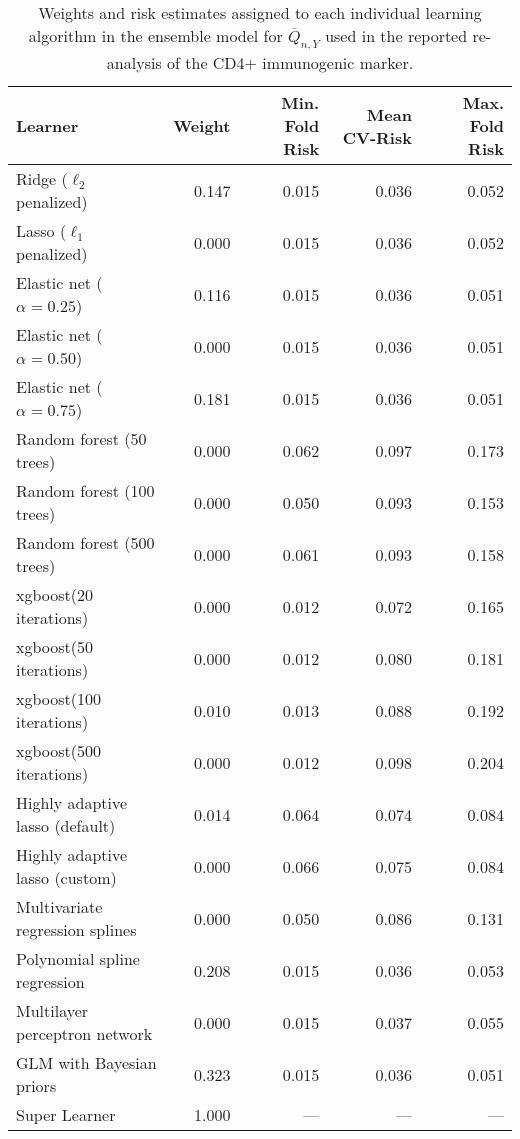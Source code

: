 \begin{table}[H]
\caption{\label{tab:cd4_sl_coefs} Weights and risk estimates assigned to each
  individual learning algorithm in the ensemble model for $\overline{Q}_{n,Y}$
  used in the reported re-analysis of the CD4+ immunogenic marker.}
\centering
\begin{tabular}[t]{l|r|r|r|r}
\hline
Learner & Weight & Min. Fold Risk & Mean CV-Risk & Max. Fold Risk\\
\hline
Ridge ($\ell_2$ penalized) & 0.147 & 0.015 & 0.036 & 0.052\\
\hline
Lasso ($\ell_1$ penalized) & 0.000 & 0.015 & 0.036 & 0.052\\
\hline
Elastic net ($\alpha = 0.25$) & 0.116 & 0.015 & 0.036 & 0.051\\
\hline
Elastic net ($\alpha = 0.50$) & 0.000 & 0.015 & 0.036 & 0.051\\
\hline
Elastic net ($\alpha = 0.75$) & 0.181 & 0.015 & 0.036 & 0.051\\
\hline
Random forest (50 trees) & 0.000 & 0.062 & 0.097 & 0.173\\
\hline
Random forest (100 trees) & 0.000 & 0.050 & 0.093 & 0.153\\
\hline
Random forest (500 trees) & 0.000 & 0.061 & 0.093 & 0.158\\
\hline
xgboost(20 iterations) & 0.000 & 0.012 & 0.072 & 0.165\\
\hline
xgboost(50 iterations) & 0.000 & 0.012 & 0.080 & 0.181\\
\hline
xgboost(100 iterations) & 0.010 & 0.013 & 0.088 & 0.192\\
\hline
xgboost(500 iterations) & 0.000 & 0.012 & 0.098 & 0.204\\
\hline
Highly adaptive lasso (default) & 0.014 & 0.064 & 0.074 & 0.084\\
\hline
Highly adaptive lasso (custom) & 0.000 & 0.066 & 0.075 & 0.084\\
\hline
Multivariate regression splines & 0.000 & 0.050 & 0.086 & 0.131\\
\hline
Polynomial spline regression & 0.208 & 0.015 & 0.036 & 0.053\\
\hline
Multilayer perceptron network & 0.000 & 0.015 & 0.037 & 0.055\\
\hline
GLM with Bayesian priors & 0.323 & 0.015 & 0.036 & 0.051\\
\hline
Super Learner & 1.000 & --- & --- & ---\\
\hline
\end{tabular}
\end{table}

